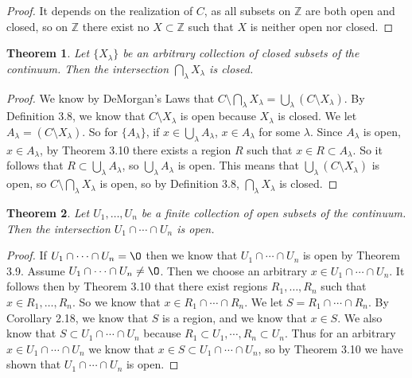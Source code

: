 \documentclass[12pt]{article}
\renewcommand{\emptyset}{\O}
\renewcommand{\_}[1]{\underline{ #1 }}
\newtheorem{theorem}{Theorem}[section]
\theoremstyle{definition}
\numberwithin{equation}{subsection}
\begin{document}
\begin{proof}
It depends on the realization of $C$, as all subsets on $\mathbb Z$ are both open and closed, so on $\mathbb Z$ there exist no $X \subset \mathbb Z$ such that $X$ is neither open nor closed.
\end{proof}

\begin{theorem}  Let $\{X_{\lambda} \}$ be an arbitrary collection of closed subsets of the continuum.  Then the intersection $\bigcap_{\lambda} X_{\lambda}$ is closed.
\end{theorem}

\begin{proof}
We know by DeMorgan's Laws that $C \setminus \bigcap_{\lambda} X_{\lambda} = \bigcup_{\lambda} (C \setminus X_{\lambda}).$ By Definition 3.8, we know that $C \setminus X_{\lambda}$ is open because $X_{\lambda}$ is closed. We let $A_{\lambda} = (C \setminus X_{\lambda})$. So for $\{A_{\lambda}\}$, if $x \in \bigcup_{\lambda} A_{\lambda}$, $x \in A_{\lambda}$ for some $\lambda$. Since $A_{\lambda}$ is open, $x \in A_{\lambda}$, by Theorem 3.10 there exists a region $R$ such that $x \in R \subset A_{\lambda}$. So it follows that $R \subset \bigcup_{\lambda} A_{\lambda}$, so $ \bigcup_{\lambda} A_{\lambda}$ is open. This means that $\bigcup_{\lambda} (C \setminus X_{\lambda})$ is open, so $C \setminus \bigcap_{\lambda} X_{\lambda}$ is open, so by Definition 3.8, $\bigcap_{\lambda} X_{\lambda}$ is closed. 
\end{proof}

\begin{theorem}  Let $U_1, \dotsc, U_n$ be a finite collection of open subsets of the continuum.  Then the intersection $U_1 \cap \dotsm \cap U_n$ is open.
\end{theorem}
\begin{proof}
If $U_1 \cap \dotsm \cap U_n = \emptyset$ then we know that $U_1 \cap \dotsm \cap U_n$ is open by Theorem 3.9. Assume $U_1 \cap \dotsm \cap U_n \not = \emptyset$. Then we choose an arbitrary $x \in U_1 \cap \dotsm \cap U_n$. It follows then by Theorem 3.10 that there exist regions $R_1, \dotsc, R_n$ such that $x \in R_1, \dotsc, R_n$. So we know that $x \in R_1 \cap \dotsm \cap R_n$. We let $S = R_1 \cap \dotsm \cap R_n$. By Corollary 2.18, we know that $S$ is a region, and we know that $x \in S$. We also know that $S \subset U_1 \cap \dotsm \cap U_n$ because $R_1 \subset U_1, \dotsm, R_n \subset U_n$. Thus for an arbitrary $x \in U_1 \cap \dotsm \cap U_n$ we know that $x \in S \subset U_1 \cap \dotsm \cap U_n$, so by Theorem 3.10 we have shown that $U_1 \cap \dotsm \cap U_n$ is open.
\end{proof}
\end{document}
